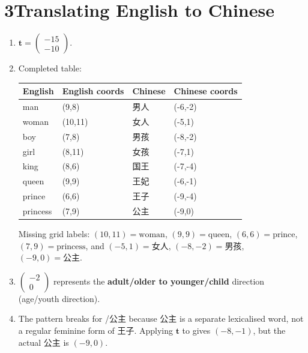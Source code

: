 \documentclass[12pt]{ctexart}
\newcommand{\colvec}[2]{\begin{pmatrix} #1 \\ #2 \end{pmatrix}}
\begin{document}
\section*{3\quad Translating English to Chinese}
\begin{enumerate}[label=\textbf{\arabic*.}]
\item \(\mathbf{t}=\colvec{-15}{-10}\).
\item Completed table:
\begin{center}
\renewcommand{\arraystretch}{1.3}
\begin{tabular}{@{}llll@{}}
\toprule
English & English coords & Chinese & Chinese coords \\
\midrule
man     & (9,8)    & 男人   & (-6,-2) \\
woman   & (10,11)  & 女人   & (-5,1) \\
boy     & (7,8)    & 男孩   & (-8,-2) \\
girl    & (8,11)   & 女孩   & (-7,1) \\
king    & (8,6)    & 国王   & (-7,-4) \\
queen   & (9,9)    & 王妃   & (-6,-1) \\
prince  & (6,6)    & 王子   & (-9,-4) \\
princess& (7,9)    & 公主   & (-9,0) \\
\bottomrule
\end{tabular}
\end{center}
Missing grid labels: \((10,11)=\text{woman}\), \((9,9)=\text{queen}\), \((6,6)=\text{prince}\), \((7,9)=\text{princess}\), and \((-5,1)=\text{女人}\), \((-8,-2)=\text{男孩}\), \((-9,0)=\text{公主}\).
\item \(\colvec{-2}{0}\) represents the \textbf{adult/older to younger/child} direction (age/youth direction).
\item The pattern breaks for /公主 because 公主 is a separate lexicalised word, not a regular feminine form of 王子. Applying \(\mathbf{t}\) to  gives \((-8,-1)\), but the actual 公主 is \((-9,0)\).
\end{enumerate}
\end{document}
